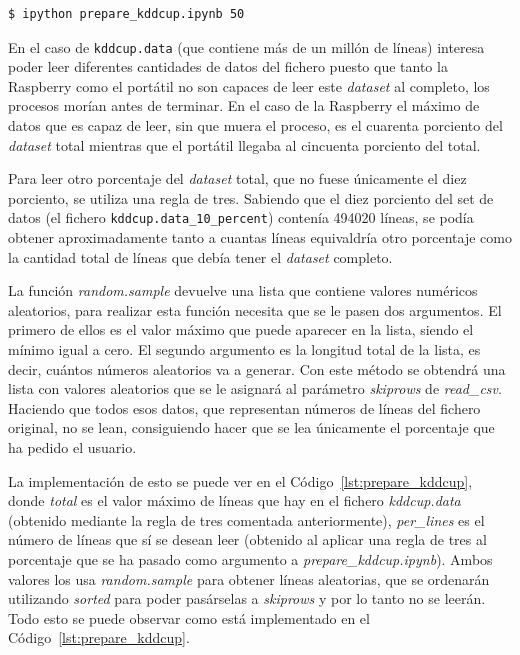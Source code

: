 \documentclass[a4paper, 12pt]{book}
\begin{document}
\begin{lstlisting}[language=bash]
    $ ipython prepare_kddcup.ipynb 50
\end{lstlisting}

En el caso de \texttt{kddcup.data} (que contiene más de un millón de líneas) interesa poder leer diferentes cantidades de datos del fichero puesto que tanto la Raspberry como el portátil no son capaces de leer este \textit{dataset} al completo, los procesos morían antes de terminar. En el caso de la Raspberry el máximo de datos que es capaz de leer, sin que muera el proceso, es el cuarenta porciento del \textit{dataset} total mientras que el portátil llegaba al cincuenta porciento del total.

Para leer otro porcentaje del \textit{dataset} total, que no fuese únicamente el diez porciento, se utiliza una regla de tres. Sabiendo que el diez porciento del set de datos (el fichero \texttt{kddcup.data\_10\_percent}) contenía 494020 líneas, se podía obtener aproximadamente tanto a cuantas líneas equivaldría otro porcentaje como la cantidad total de líneas que debía tener el \textit{dataset} completo.

La función \textit{random.sample} devuelve una lista que contiene valores numéricos aleatorios, para realizar esta función necesita que se le pasen dos argumentos. El primero de ellos es el valor máximo que puede aparecer en la lista, siendo el mínimo igual a cero. El segundo argumento es la longitud total de la lista, es decir, cuántos números aleatorios va a generar. Con este método se obtendrá una lista con valores aleatorios que se le asignará al parámetro \textit{skiprows} de \textit{read\_csv}. Haciendo que todos esos datos, que representan números de líneas del fichero original, no se lean, consiguiendo hacer que se lea únicamente el porcentaje que ha pedido el usuario.

La implementación de esto se puede ver en el Código~\ref{lst:prepare_kddcup}, donde \textit{total} es el valor máximo de líneas que hay en el fichero \textit{kddcup.data} (obtenido mediante la regla de tres comentada anteriormente), \textit{per\_lines} es el número de líneas que sí se desean leer (obtenido al aplicar una regla de tres al porcentaje que se ha pasado como argumento a \textit{prepare\_kddcup.ipynb}). Ambos valores los usa \textit{random.sample} para obtener líneas aleatorias, que se ordenarán utilizando \textit{sorted} para poder pasárselas a \textit{skiprows} y por lo tanto no se leerán. Todo esto se puede observar como está implementado en el Código~\ref{lst:prepare_kddcup}.
\end{document}
